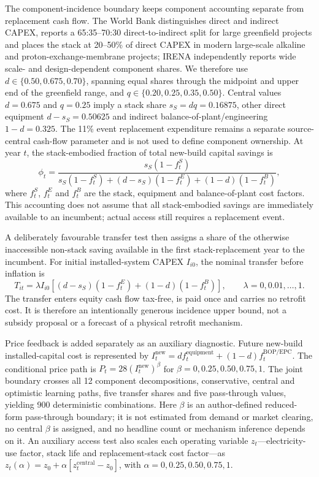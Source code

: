 \documentclass[11pt,a4paper]{article}
\begin{document}
The component-incidence boundary keeps component accounting separate from replacement cash flow. The World Bank distinguishes direct and indirect CAPEX, reports a 65:35--70:30 direct-to-indirect split for large greenfield projects and places the stack at 20--50\% of direct CAPEX in modern large-scale alkaline and proton-exchange-membrane projects\cite{worldbank2026}; IRENA independently reports wide scale- and design-dependent component shares\cite{irena2020}. We therefore use $d\in\{0.50,0.675,0.70\}$, spanning equal shares through the midpoint and upper end of the greenfield range, and $q\in\{0.20,0.25,0.35,0.50\}$. Central values $d=0.675$ and $q=0.25$ imply a stack share $s_S=dq=0.16875$, other direct equipment $d-s_S=0.50625$ and indirect balance-of-plant/engineering $1-d=0.325$. The 11\% event replacement expenditure remains a separate source-central cash-flow parameter and is not used to define component ownership. At year $t$, the stack-embodied fraction of total new-build capital savings is
\begin{equation}
\phi_t=\frac{s_S(1-f^S_t)}{s_S(1-f^S_t)+(d-s_S)(1-f^E_t)+(1-d)(1-f^B_t)},
\label{eq:si_incidence}
\end{equation}
where $f^S_t$, $f^E_t$ and $f^B_t$ are the stack, equipment and balance-of-plant cost factors. This accounting does not assume that all stack-embodied savings are immediately available to an incumbent; actual access still requires a replacement event.

A deliberately favourable transfer test then assigns a share of the otherwise inaccessible non-stack saving available in the first stack-replacement year to the incumbent. For initial installed-system CAPEX $I_{i0}$, the nominal transfer before inflation is
\begin{equation}
T_{it}=\lambda I_{i0}\left[(d-s_S)(1-f^E_t)+(1-d)(1-f^B_t)\right],
\qquad \lambda=0,0.01,\ldots,1.
\label{eq:si_transfer}
\end{equation}
The transfer enters equity cash flow tax-free, is paid once and carries no retrofit cost. It is therefore an intentionally generous incidence upper bound, not a subsidy proposal or a forecast of a physical retrofit mechanism.

Price feedback is added separately as an auxiliary diagnostic. Future new-build installed-capital cost is represented by $I_t^{\mathrm{new}}=d f_t^{\mathrm{equipment}}+(1-d)f_t^{\mathrm{BOP/EPC}}$. The conditional price path is $P_t=28(I_t^{\mathrm{new}})^\beta$ for $\beta=0,0.25,0.50,0.75,1$. The joint boundary crosses all 12 component decompositions, conservative, central and optimistic learning paths, five transfer shares and five pass-through values, yielding 900 deterministic combinations. Here $\beta$ is an author-defined reduced-form pass-through boundary; it is not estimated from demand or market clearing, no central $\beta$ is assigned, and no headline count or mechanism inference depends on it. An auxiliary access test also scales each operating variable $z_t$---electricity-use factor, stack life and replacement-stack cost factor---as $z_t(\alpha)=z_0+\alpha[z_t^{\mathrm{central}}-z_0]$, with $\alpha=0,0.25,0.50,0.75,1$.
\end{document}
